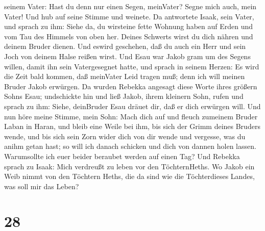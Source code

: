 seinem Vater: Hast du denn nur einen Segen, meinVater? Segne mich auch,
mein Vater! Und hub auf seine Stimme und weinete.  Da
antwortete Isaak, sein Vater, und sprach zu ihm: Siehe da, du wirsteine
fette Wohnung haben auf Erden und vom Tau des Himmels von oben her.
 Deines Schwerts wirst du dich nähren und deinem Bruder
dienen. Und eswird geschehen, daß du auch ein Herr und sein Joch von
deinem Halse reißen wirst.  Und Esau war Jakob gram um des
Segens willen, damit ihn sein Vatergesegnet hatte, und sprach in seinem
Herzen: Es wird die Zeit bald kommen, daß meinVater Leid tragen muß;
denn ich will meinen Bruder Jakob erwürgen.  Da wurden
Rebekka angesagt diese Worte ihres größern Sohns Esau; undschickte hin
und ließ Jakob, ihrem kleinern Sohn, rufen und sprach zu ihm: Siehe,
deinBruder Esau dräuet dir, daß er dich erwürgen will.  Und
nun höre meine Stimme, mein Sohn: Mach dich auf und fleuch zumeinem
Bruder Laban in Haran,  und bleib eine Weile bei ihm, bis
sich der Grimm deines Bruders wende,  und bis sich sein
Zorn wider dich von dir wende und vergesse, was du anihm getan hast; so
will ich danach schicken und dich von dannen holen lassen. Warumsollte
ich euer beider beraubet werden auf einen Tag?  Und Rebekka
sprach zu Isaak: Mich verdreußt zu leben vor den TöchternHeths. Wo Jakob
ein Weib nimmt von den Töchtern Heths, die da sind wie die Töchterdieses
Landes, was soll mir das Leben?

\hypertarget{section-27}{%
\section{28}\label{section-27}}

